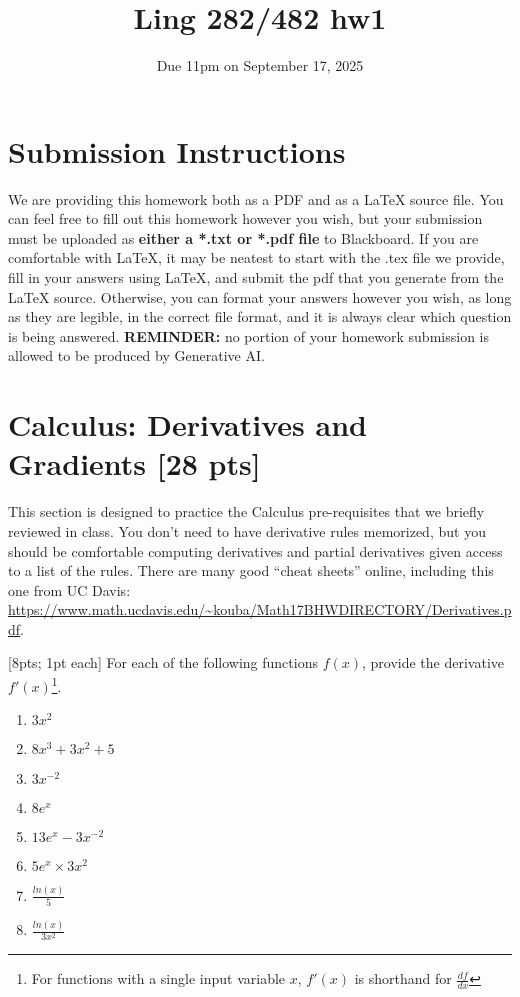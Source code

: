 \documentclass[11pt]{article}
\begin{document}
\title{Ling 282/482 hw1}
\date{\vspace{-0.2in}Due 11pm on September 17, 2025}
\maketitle

\section*{Submission Instructions}
We are providing this homework both as a PDF and as a LaTeX source file. You can feel free to fill out this homework however you wish, but your submission must be uploaded as \textbf{either a *.txt or *.pdf file} to Blackboard. If you are comfortable with LaTeX, it may be neatest to start with the .tex file we provide, fill in your answers using LaTeX, and submit the pdf that you generate from the LaTeX source. Otherwise, you can format your answers however you wish, as long as they are legible, in the correct file format, and it is always clear which question is being answered. \textbf{REMINDER:} no portion of your homework submission is allowed to be produced by Generative AI.

\section{Calculus: Derivatives and Gradients [28 pts]}

This section is designed to practice the Calculus pre-requisites that we briefly reviewed in class. You don't need to have derivative rules memorized, but you should be comfortable computing derivatives and partial derivatives given access to a list of the rules. There are many good ``cheat sheets'' online, including this one from UC Davis: \url{https://www.math.ucdavis.edu/~kouba/Math17BHWDIRECTORY/Derivatives.pdf}.

\vspace{2em}
 [8pts; 1pt each] For each of the following functions $f(x)$, provide the derivative $f'(x)$\footnote{For functions with a single input variable $x$, $f'(x)$ is shorthand for $\frac{df}{dx}$}.

\begin{enumerate}[label=\alph*.]
    \setlength\itemsep{1em}
    \item $3x^2$
    \item $8x^3 + 3x^2 + 5$
    \item $3x^{-2}$
    \item $8e^x$
    \item $13e^x - 3x^{-2}$
    \item $5e^x \times 3x^2$
    \item $\frac{ln(x)}{5}$
    \item $\frac{ln(x)}{3x^2}$
\end{enumerate}
\end{document}
